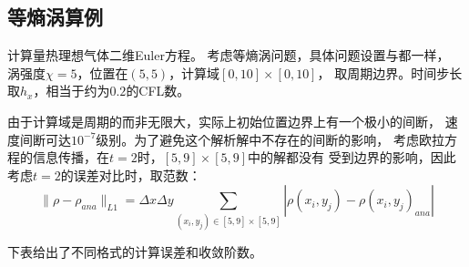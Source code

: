 \documentclass[UTF8,zihao=5]{ctexart} %
\newcommand*{\inc}[0]{{\Delta}}
\begin{document}
\subsection{等熵涡算例}

计算量热理想气体二维Euler方程。
考虑等熵涡问题，具体问题设置与\cite{hu1999weighted}都一样，
涡强度$\chi=5$，位置在$(5,5)$，计算域$[0,10]\times[0,10]$，
取周期边界。时间步长取$h_x$，相当于约为$0.2$的CFL数。

由于计算域是周期的而非无限大，实际上初始位置边界上有一个极小的间断，
速度间断可达$10^{-7}$级别。为了避免这个解析解中不存在的间断的影响，
考虑欧拉方程的信息传播，在$t=2$时，$[5,9]\times[5,9]$中的解都没有
受到边界的影响，因此考虑$t=2$的误差对比时，取范数：
$$
    \|\rho-\rho_{ana}\|_{L1} =
    \inc x\inc y\sum_{(x_i,y_j)\in[5,9]\times[5,9]}{|\rho(x_i,y_j)-\rho(x_i,y_j)_{ana}|}
$$

下表给出了不同格式的计算误差和收敛阶数。
\end{document}
